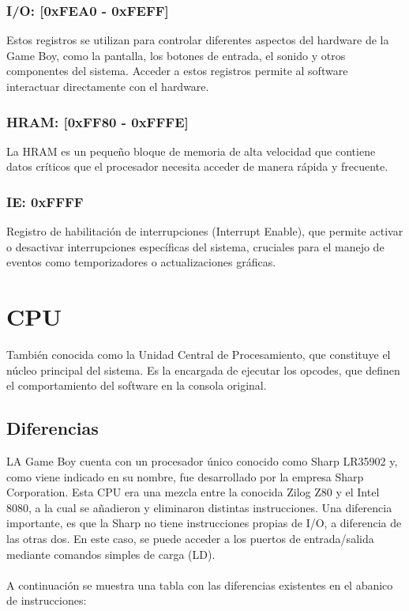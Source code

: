\subsubsection{I/O: [0xFEA0 - 0xFEFF]}
Estos registros se utilizan para controlar diferentes aspectos del hardware de la Game Boy, como la pantalla, los botones de entrada, el sonido y otros componentes del sistema. Acceder a estos registros permite al software interactuar directamente con el hardware.

\subsubsection{HRAM: [0xFF80 - 0xFFFE]}
La HRAM es un pequeño bloque de memoria de alta velocidad que contiene datos críticos que el procesador necesita acceder de manera rápida y frecuente.

\subsubsection{IE: 0xFFFF}
Registro de habilitación de interrupciones (Interrupt Enable), que permite activar o desactivar interrupciones específicas del sistema, cruciales para el manejo de eventos como temporizadores o actualizaciones gráficas.

\section{CPU}

También conocida como la Unidad Central de Procesamiento, que constituye el núcleo principal del sistema. Es la encargada de ejecutar los opcodes, que definen el comportamiento del software en la consola original.

\subsection{Diferencias}

LA Game Boy cuenta con un procesador único conocido como Sharp LR35902 y, como viene indicado en su nombre, fue desarrollado por la empresa Sharp Corporation. Esta CPU era una mezcla entre la conocida Zilog Z80 y el Intel 8080, a la cual se añadieron y eliminaron distintas instrucciones. Una diferencia importante, es que la Sharp no tiene instrucciones propias de I/O, a diferencia de las otras dos. En este caso, se puede acceder a los puertos de entrada/salida mediante comandos simples de carga (LD).
\\\\
A continuación se muestra una tabla con las diferencias existentes en el abanico de instrucciones:

